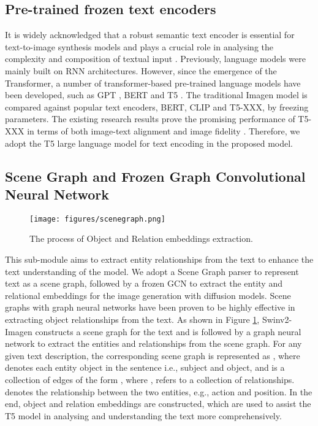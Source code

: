 \documentclass{article}
\begin{document}
\subsection{Pre-trained frozen text encoders}
It is widely acknowledged that a robust semantic text encoder is essential for text-to-image synthesis models and plays a crucial role in analysing the complexity and composition of textual input \cite{Saharia2022PhotorealisticTD}. Previously, language models were mainly built on RNN architectures. However, since the emergence of the Transformer, a number of transformer-based pre-trained language models have been developed, such as GPT \cite{Radford2018ImprovingLU, Radford2019LanguageMA, Brock2019LargeSG}, BERT \cite{Devlin2019BERTPO} and T5 \cite{Raffel2020ExploringTL}. The traditional Imagen model is compared against popular text encoders, BERT, CLIP and T5-XXX, by freezing parameters. The existing research results prove the promising performance of T5-XXX in terms of both image-text alignment and image fidelity \cite{Saharia2022PhotorealisticTD}. Therefore, we adopt the T5 large language model for text encoding in the proposed model.

\subsection{Scene Graph and Frozen Graph Convolutional Neural Network}

\begin{figure}[!h]
    \centering
    \texttt{[image: figures/scenegraph.png]}
    \caption{The process of Object and Relation embeddings extraction.}
    \label{fig:sg}
\end{figure}
This sub-module aims to extract entity relationships from the text to enhance the text understanding of the model. We adopt a Scene Graph parser to represent text as a scene graph, followed by a frozen GCN to extract the entity and relational embeddings for the image generation with diffusion models. Scene graphs with graph neural networks \cite{Johnson2018ImageGF} have been proven to be highly effective in extracting object relationships from the text. As shown in Figure \ref{fig:sg}, Swinv2-Imagen constructs a scene graph for the text and is followed by a graph neural network to extract the entities and relationships from the scene graph. For any given text description, the corresponding scene graph is represented as , where    denotes each entity object in the sentence i.e., subject and object, and  is a collection of edges of the form , where ,  refers to a collection of relationships.  denotes the relationship between the two entities, e.g., action and position. In the end, object and relation embeddings are constructed, which are used to assist the T5 model in analysing and understanding the text more comprehensively.
\end{document}
